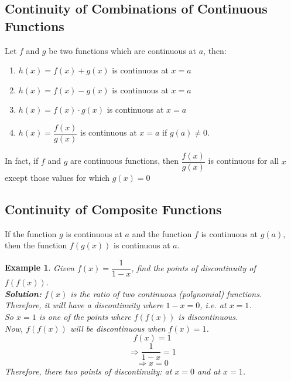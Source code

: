 \documentclass[14]{article}
\newtheorem*{ex}{Example}
\theoremstyle{definition}
\theoremstyle{case}
\begin{document}
\subsection{Continuity of Combinations of Continuous Functions}
Let $f$ and $g$ be two functions which are continuous at $a$, then:
\begin{enumerate}
\item $h(x) = f(x) + g(x)$ is continuous at 
$x = a$
\item $h(x) = f(x) - g(x)$ is continuous at $x = a$
\item $h(x) = f(x)\cdot g(x)$ is continuous at $x = a$
\item $h(x) = \dfrac{f(x)}{g(x)}$ is continuous at $x = a$ if $g(a) \neq 0$.
\end{enumerate}
In fact, if $f$ and $g$ are continuous functions, then $\dfrac{f(x)}{g(x)}$ is continuous for all $x$ except those values for which $g(x)=0$
\subsection{Continuity of Composite Functions}
If the function $g$ is continuous at $a$ and the function $f$ is continuous at $g(a)$, then the function $f(g(x))$ is continuous at $a$.
\begin{ex}
Given $f(x) = \dfrac{1}{1-x}$, find the points of discontinuity of $f(f(x))$.\\
\textbf{Solution: }$f(x)$ is the ratio of two continuous (polynomial) functions. Therefore, it will have a discontinuity where $1 - x = 0$, i.e. at $x = 1$.\\
So $x = 1$ is one of the points where $f(f(x))$ is discontinuous.\\
Now, $f(f(x))$ will be discontinuous when $f(x) = 1$.\\
\[f(x) = 1\]
\[\Rightarrow \dfrac{1}{1-x}=1\]
\[\Rightarrow x = 0\]
Therefore, there two points of discontinuity: at $x = 0$ and at $x = 1$.
\end{ex}
\pagebreak
\end{document}
